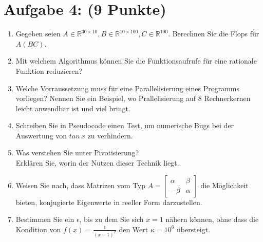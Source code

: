 \documentclass[12pt]{article}
\begin{document}
\pagebreak

\newcommand{\realVector}[2]{#1\in \mathbb{R}^{#2}}
\newcommand{\realMatrix}[3]{#1\in \mathbb{R}^{#2\times #3}}

\section*{Aufgabe 4: (9 Punkte)}

\begin{enumerate}

	\item Gegeben seien $\realMatrix{A}{30}{10}, \realMatrix{B}{10}{100}, \realVector{C}{100}$. Berechnen Sie die Flops für $A(BC)$.
	
	\vspace{1cm}
	
	\item Mit welchem Algorithmus können Sie die Funktionsaufrufe für eine rationale Funktion reduzieren?
	
	\vspace{1cm}
	
	\item Welche Vorraussetzung muss für eine Parallelisierung eines Programms vorliegen? Nennen Sie ein Beispiel, wo Prallelisierung auf 8 Rechnerkernen leicht anwendbar ist und viel bringt.
	
	\vspace{2cm}
	
	
	\item Schreiben Sie in Pseudocode einen Test, um numerische Bugs bei der Auswertung von $tan\,x$ zu verhindern.
	
	\vspace{2cm}
	
	\item Was verstehen Sie unter Pivotisierung?\\
	Erklären Sie, worin der Nutzen dieser Technik liegt.


	\vspace{2cm}
	
	\item Weisen Sie nach, dass Matrizen vom Typ $A = \begin{bmatrix} \alpha & \beta \\ -\beta & \alpha \end{bmatrix}$ die  Möglichkeit bieten, konjugierte Eigenwerte in reeller Form darzustellen.
	
	\vspace{2.5cm}
	
	\item Bestimmen Sie ein $\epsilon$, bis zu dem Sie sich $x=1$ nähern können, ohne dass die Kondition von $f(x) = \frac{1}{(x-1)^2}$ den Wert $\kappa = 10^6$ übersteigt.
	

\end{enumerate}
\end{document}
